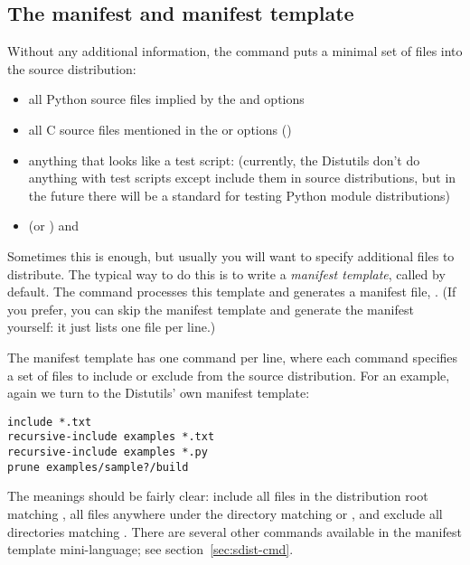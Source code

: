 \documentclass{howto}
\begin{document}
\subsection{The manifest and manifest template}
\label{sec:manifest}

Without any additional information, the  command puts a
minimal set of files into the source distribution:
\begin{itemize}
\item all Python source files implied by the  and
   options
\item all C source files mentioned in the  or
   options ()
\item anything that looks like a test script: 
  (currently, the Distutils don't do anything with test scripts except
  include them in source distributions, but in the future there will be
  a standard for testing Python module distributions)
\item {} (or ) and 
\end{itemize}
Sometimes this is enough, but usually you will want to specify
additional files to distribute.  The typical way to do this is to write
a \emph{manifest template}, called  by default.  The
 command processes this template and generates a manifest
file, .  (If you prefer, you can skip the manifest
template and generate the manifest yourself: it just lists one file per
line.)

The manifest template has one command per line, where each command
specifies a set of files to include or exclude from the source
distribution.  For an example, again we turn to the Distutils' own
manifest template:
\begin{verbatim}
include *.txt
recursive-include examples *.txt
recursive-include examples *.py
prune examples/sample?/build
\end{verbatim}
The meanings should be fairly clear: include all files in the
distribution root matching , all files anywhere under the
 directory matching  or , and
exclude all directories matching .  There
are several other commands available in the manifest template
mini-language; see section~\ref{sec:sdist-cmd}.
\end{document}
